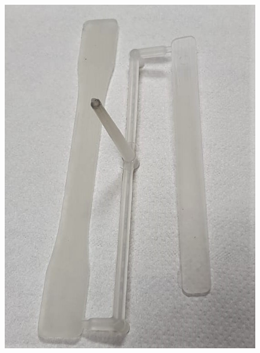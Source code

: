\documentclass[a4paper, 11pt]{article}
\begin{document}
\begin{figure}[htp]
{\includegraphics[scale=0.25]{PA11ASTM}} \\
\subfloat[][]

\end{figure}
\end{document}
